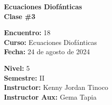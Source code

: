 \begin{center} \textbf
{
    \Large Ecuaciones Diofánticas \\ \vspace{2mm}Clase \#3
}
\end{center}

\begin{multicols}{2}
{
    \textbf{Encuentro:} 18\\
    \textbf{Curso:} Ecuaciones Diofánticas\\
    \textbf{Fecha:} 24 de agosto de 2024\\
    \begin{flushright}
        \textbf{Nivel:} 5\\
        \textbf{Semestre:} II\\
        \textbf{Instructor:} Kenny Jordan Tinoco\\
        \textbf{Instructor Aux:} Gema Tapia
    \end{flushright}
}
\end{multicols}

\thispagestyle{first-page-style}